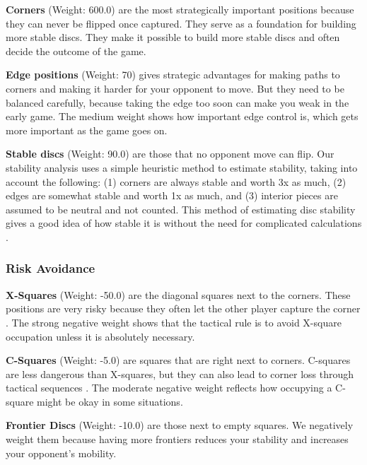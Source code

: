 \documentclass[10pt, titlepage, oneside, a4paper]{article}
\begin{document}
\textbf{Corners} (Weight: 600.0) are the most strategically important positions because they can never be flipped once captured\cite{brianothello2005}.  They serve as a foundation for building more stable discs. They make it possible to build more stable discs and often decide the outcome of the game\cite{brianothello2005}.

\textbf{Edge positions} (Weight: 70) gives strategic advantages for making paths to corners and making it harder for your opponent to move.  But they need to be balanced carefully, because taking the edge too soon can make you weak in the early game\cite{brianothello2005}.  The medium weight shows how important edge control is, which gets more important as the game goes on.

\textbf{Stable discs} (Weight: 90.0) are those that no opponent move can flip.  Our stability analysis uses a simple heuristic method to estimate stability, taking into account the following: (1) corners are always stable and worth 3x as much, (2) edges are somewhat stable and worth 1x as much, and (3) interior pieces are assumed to be neutral and not counted.  This method of estimating disc stability gives a good idea of how stable it is without the need for complicated calculations \cite{othello-heuristics-analysis}. 



\subsubsection{Risk Avoidance}

\vspace{0.5em}

\textbf{X-Squares} (Weight: -50.0) are the diagonal squares next to the corners.  These positions are very risky because they often let the other player capture the corner \cite{brianothello2005}.  The strong negative weight shows that the tactical rule is to avoid X-square occupation unless it is absolutely necessary.

\textbf{C-Squares} (Weight: -5.0) are squares that are right next to corners.  C-squares are less dangerous than X-squares, but they can also lead to corner loss through tactical sequences \cite{brianothello2005}.  
The moderate negative weight reflects how occupying a C-square might be okay in some situations.

\textbf{Frontier Discs} (Weight: -10.0) are those next to empty squares. We negatively weight them because having more frontiers reduces your stability and increases your opponent's mobility\cite{brianothello2005}.
\end{document}
